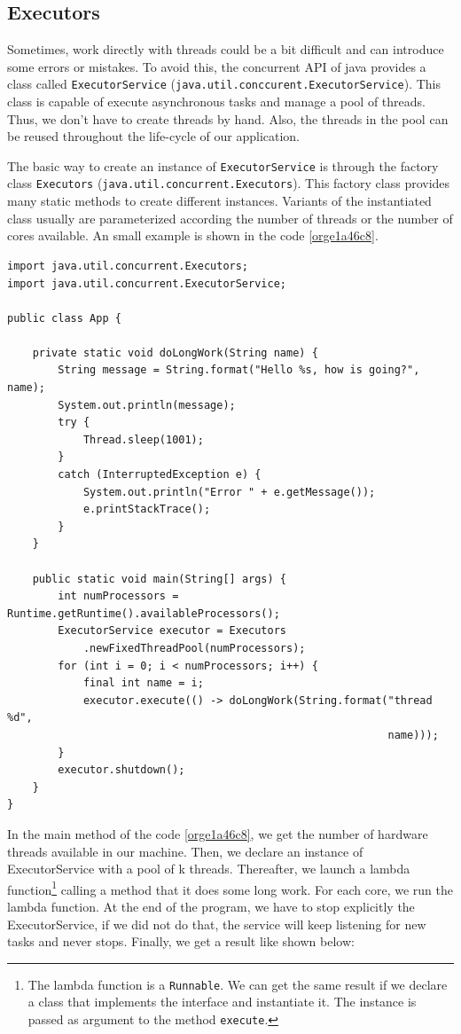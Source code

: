 \documentclass{latex/classes/thesis}
\begin{document}
\subsection{Executors}
\label{sec:orgc218cf6}

Sometimes, work directly with threads could be a bit difficult and can
introduce some errors or mistakes. To avoid this, the concurrent API of java
provides a class called \texttt{ExecutorService}
(\texttt{java.util.conccurent.ExecutorService}). This class is capable of execute
asynchronous tasks and manage a pool of threads. Thus, we don't have to
create threads by hand. Also, the threads in the pool can be reused
throughout the life-cycle of our application.

The basic way to create an instance of \texttt{ExecutorService} is through the factory
class \texttt{Executors} (\texttt{java.util.concurrent.Executors}). This factory class provides
many static methods to create different instances. Variants of the
instantiated class usually are parameterized according the number of threads
or the number of cores available. An small example is shown in the code
\ref{orge1a46c8}.

\begin{lstlisting}
import java.util.concurrent.Executors;
import java.util.concurrent.ExecutorService;

public class App {

    private static void doLongWork(String name) {
        String message = String.format("Hello %s, how is going?", name);
        System.out.println(message);
        try {
            Thread.sleep(1001);
        }
        catch (InterruptedException e) {
            System.out.println("Error " + e.getMessage());
            e.printStackTrace();
        }
    }

    public static void main(String[] args) {
        int numProcessors = Runtime.getRuntime().availableProcessors();
        ExecutorService executor = Executors
            .newFixedThreadPool(numProcessors);
        for (int i = 0; i < numProcessors; i++) {
            final int name = i;
            executor.execute(() -> doLongWork(String.format("thread %d",
                                                            name)));
        }
        executor.shutdown();
    }
}
\end{lstlisting}

In the main method of the code \ref{orge1a46c8}, we get the number of hardware
threads available in our machine. Then, we declare an instance of
ExecutorService with a pool of k threads. Thereafter, we launch a lambda
function\footnote{The lambda function is a \texttt{Runnable}. We can get the same result if we
declare a class that implements the interface and instantiate it. The instance
is passed as argument to the method \texttt{execute}.} calling a method that it does some long work. For each core,
we run the lambda function. At the end of the program, we have to stop
explicitly the ExecutorService, if we did not do that, the service will keep
listening for new tasks and never stops. Finally, we get a result like shown
below:
\end{document}
